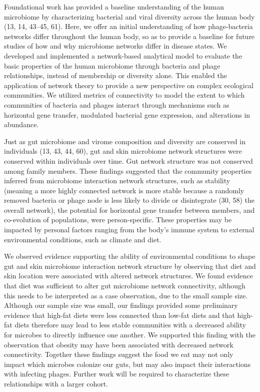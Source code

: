 \documentclass[12pt,]{article}
\begin{document}
Foundational work has provided a baseline understanding of the human
microbiome by characterizing bacterial and viral diversity across the
human body (13, 14, 43--45, 61). Here, we offer an initial understanding
of how phage-bacteria networks differ throughout the human body, so as
to provide a baseline for future studies of how and why microbiome
networks differ in disease states. We developed and implemented a
network-based analytical model to evaluate the basic properties of the
human microbiome through bacteria and phage relationships, instead of
membership or diversity alone. This enabled the application of network
theory to provide a new perspective on complex ecological communities.
We utilized metrics of connectivity to model the extent to which
communities of bacteria and phages interact through mechanisms such as
horizontal gene transfer, modulated bacterial gene expression, and
alterations in abundance.

Just as gut microbiome and virome composition and diversity are
conserved in individuals (13, 43, 44, 60), gut and skin microbiome
network structures were conserved within individuals over time. Gut
network structure was not conserved among family members. These findings
suggested that the community properties inferred from microbiome
interaction network structures, such as stability (meaning a more highly
connected network is more stable because a randomly removed bacteria or
phage node is less likely to divide or disintegrate (30, 58) the overall
network), the potential for horizontal gene transfer between members,
and co-evolution of populations, were person-specific. These properties
may be impacted by personal factors ranging from the body's immune
system to external environmental conditions, such as climate and diet.

We observed evidence supporting the ability of environmental conditions
to shape gut and skin microbiome interaction network structure by
observing that diet and skin location were associated with altered
network structures. We found evidence that diet was sufficient to alter
gut microbiome network connectivity, although this needs to be
interpreted as a case observation, due to the small sample size.
Although our sample size was small, our findings provided some
preliminary evidence that high-fat diets were less connected than
low-fat diets and that high-fat diets therefore may lead to less stable
communities with a decreased ability for microbes to directly influence
one another. We supported this finding with the observation that obesity
may have been associated with decreased network connectivity. Together
these findings suggest the food we eat may not only impact which
microbes colonize our guts, but may also impact their interactions with
infecting phages. Further work will be required to characterize these
relationships with a larger cohort.
\end{document}
